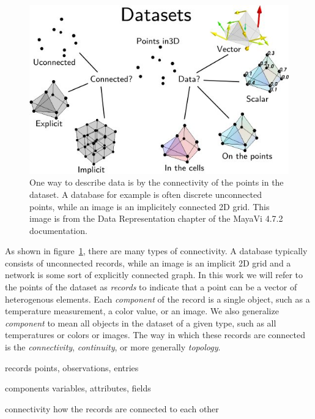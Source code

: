 \documentclass[../main.tex]{subfiles}
\begin{document}
\begin{figure}[H]
    \includegraphics[width=1\textwidth]{figures/intro/dataset_diagram.png}
    \caption{One way to describe data is by the connectivity of the points in the dataset. A database for example is often discrete unconnected points, while an image is an implicitely connected 2D grid. This image is from the Data Representation chapter of the MayaVi 4.7.2 documentation.\cite{DataRepresentationMayavi}}
    \label{fig:intro_data_format}
\end{figure}
As shown in figure~\ref{fig:intro_data_format}, there are many types of connectivity. A database typically consists of unconnected records, while an image is an implicit 2D grid and a network is some sort of explicitly connected graph.  In this work we will refer to the points of the dataset as \textit{records} to indicate that a point can be a vector of heterogenous elements. Each \textit{component} of the record is a single object, such as a temperature measurement, a color value, or an image. We also generalize \textit{component} to mean all objects in the dataset of a given type, such as all temperatures or colors or images. The way in which these records are connected is the \textit{connectivity}, \textit{continuity}, or more generally \textit{topology}.

\begin{mdframed}[roundcorner=10pt, frametitle= definitions, frametitlerule=true, frametitlebackgroundcolor=gray!10]
\begin{definition}
    \item[records] points, observations, entries 
    \item[components] variables, attributes, fields 
    \item[connectivity] how the records are connected to each other
\end{definition}
\end{mdframed}
\end{document}
